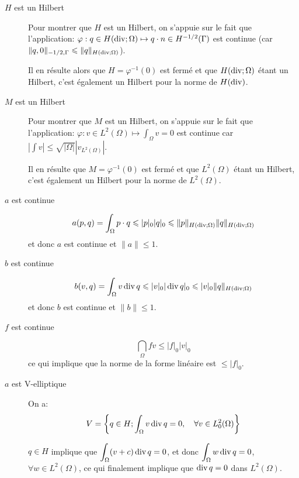 \begin{description}
\item[$H$ est un Hilbert]
Pour montrer que $H$ est un Hilbert, on s'appuie sur le fait que l'application:
$\varphi: q\in H(\operatorname{div};\Omega)\mapsto q\cdot n\in H^{-1/2}(\Gamma)$ est continue
(car $\|q,0\|_{-1/2,\Gamma}\leqslant \|q\|_{H(\operatorname{div};\Omega)}$).

Il en résulte alors que $H=\varphi^{-1}(0)$ est fermé et que $H(\operatorname{div};\Omega)$ étant un
Hilbert, c'est également un Hilbert pour la norme de $H(\operatorname{div})$.

\medskip
\item[$M$ est un Hilbert]
Pour montrer que $M$ est un Hilbert, on s'appuie sur le fait que l'application:
$\varphi: v\in L^2(\Omega)\mapsto \int_\Omega v=0$ est continue
car $|\int v| \le \sqrt{|\Omega|} |v_{L^2(\Omega)}|$.

Il en résulte que $M=\varphi^{-1}(0)$ est fermé et que $L^2(\Omega)$ étant un
Hilbert, c'est également un Hilbert pour la norme de $L^2(\Omega)$.

\medskip
\item[$a$ est continue]
\begin{equation}a(p,q)=\displaystyle\int_\Omega p\cdot q\leqslant |p|_0 |q|_0 \leqslant \|p\|_{H(\operatorname{div};\Omega)} \|q\|_{H(\operatorname{div};\Omega)}\end{equation}
et donc $a$ est continue et $\|a\|\le 1$.

\medskip
\item[$b$ est continue]
\begin{equation}b(v,q)=\displaystyle\int_\Omega v \operatorname{div} q \leqslant |v|_0 |\operatorname{div} q|_0 \leqslant |v|_0 \|q\|_{H(\operatorname{div};\Omega)}\end{equation}
et donc $b$ est continue et $\|b\|\le 1$.

\medskip
\item[$f$ est continue]
\begin{equation}\dint_\Omega fv\le |f|_0 |v|_0\end{equation} ce qui implique que la norme de la forme linéaire
est $\le |f|_0$.

\medskip
\item[$a$ est V-elliptique]
On a:
\begin{equation}V=\left\{ q\in H; \displaystyle\int_\Omega v \operatorname{div} q =0,\quad \forall v\in L^2_0(\Omega)\right\}\end{equation}

$q\in H$ implique que $\displaystyle\int_\Omega (v+c)\operatorname{div} q =0$, et donc
$\displaystyle\int_\Omega w \operatorname{div} q=0$, $\forall w\in L^2(\Omega)$, ce qui finalement
implique que $\operatorname{div} q=0$ dans $L^2(\Omega)$.


\end{description}
